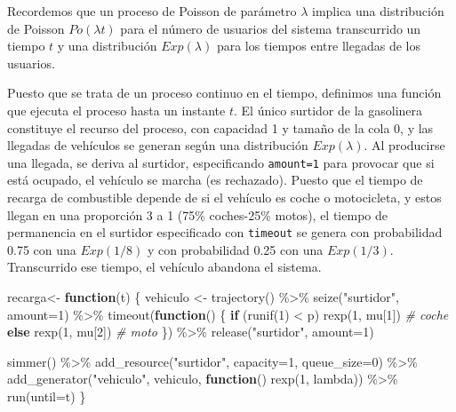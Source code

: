 \documentclass[
]{book}
\newenvironment{Shaded}{\begin{snugshade}}{\end{snugshade}}
\newcommand{\AttributeTok}[1]{\textcolor[rgb]{0.77,0.63,0.00}{#1}}
\newcommand{\CommentTok}[1]{\textcolor[rgb]{0.56,0.35,0.01}{\textit{#1}}}
\newcommand{\ControlFlowTok}[1]{\textcolor[rgb]{0.13,0.29,0.53}{\textbf{#1}}}
\newcommand{\DecValTok}[1]{\textcolor[rgb]{0.00,0.00,0.81}{#1}}
\newcommand{\FunctionTok}[1]{\textcolor[rgb]{0.00,0.00,0.00}{#1}}
\newcommand{\NormalTok}[1]{#1}
\newcommand{\OtherTok}[1]{\textcolor[rgb]{0.56,0.35,0.01}{#1}}
\newcommand{\SpecialCharTok}[1]{\textcolor[rgb]{0.00,0.00,0.00}{#1}}
\newcommand{\StringTok}[1]{\textcolor[rgb]{0.31,0.60,0.02}{#1}}
\theoremstyle{definition}
\theoremstyle{definition}
\theoremstyle{definition}
\theoremstyle{definition}
\theoremstyle{remark}
\begin{document}
Recordemos que un proceso de Poisson de parámetro \(\lambda\) implica una distribución de Poisson \(Po(\lambda t)\) para el número de usuarios del sistema transcurrido un tiempo \(t\) y una distribución \(Exp(\lambda)\) para los tiempos entre llegadas de los usuarios.

Puesto que se trata de un proceso continuo en el tiempo, definimos una función que ejecuta el proceso hasta un instante \(t\). El único surtidor de la gasolinera constituye el recurso del proceso, con capacidad 1 y tamaño de la cola 0, y las llegadas de vehículos se generan según una distribución \(Exp(\lambda)\). Al producirse una llegada, se deriva al surtidor, especificando \texttt{amount=1} para provocar que si está ocupado, el vehículo se marcha (es rechazado). Puesto que el tiempo de recarga de combustible depende de si el vehículo es coche o motocicleta, y estos llegan en una proporción 3 a 1 (75\% coches-25\% motos), el tiempo de permanencia en el surtidor especificado con \texttt{timeout} se genera con probabilidad 0.75 con una \(Exp(1/8)\) y con probabilidad 0.25 con una \(Exp(1/3)\). Transcurrido ese tiempo, el vehículo abandona el sistema.

\begin{Shaded}
\begin{Highlighting}[]
\NormalTok{ recarga}\OtherTok{\textless{}{-}} \ControlFlowTok{function}\NormalTok{(t) \{}
\NormalTok{  vehiculo }\OtherTok{\textless{}{-}} \FunctionTok{trajectory}\NormalTok{() }\SpecialCharTok{\%\textgreater{}\%}
    \FunctionTok{seize}\NormalTok{(}\StringTok{"surtidor"}\NormalTok{, }\AttributeTok{amount=}\DecValTok{1}\NormalTok{) }\SpecialCharTok{\%\textgreater{}\%}
    \FunctionTok{timeout}\NormalTok{(}\ControlFlowTok{function}\NormalTok{() \{}
      \ControlFlowTok{if}\NormalTok{ (}\FunctionTok{runif}\NormalTok{(}\DecValTok{1}\NormalTok{) }\SpecialCharTok{\textless{}}\NormalTok{ p) }\FunctionTok{rexp}\NormalTok{(}\DecValTok{1}\NormalTok{, mu[}\DecValTok{1}\NormalTok{])  }\CommentTok{\# coche}
      \ControlFlowTok{else} \FunctionTok{rexp}\NormalTok{(}\DecValTok{1}\NormalTok{, mu[}\DecValTok{2}\NormalTok{])               }\CommentTok{\# moto}
\NormalTok{    \}) }\SpecialCharTok{\%\textgreater{}\%}
    \FunctionTok{release}\NormalTok{(}\StringTok{"surtidor"}\NormalTok{, }\AttributeTok{amount=}\DecValTok{1}\NormalTok{)}

\FunctionTok{simmer}\NormalTok{() }\SpecialCharTok{\%\textgreater{}\%}
    \FunctionTok{add\_resource}\NormalTok{(}\StringTok{"surtidor"}\NormalTok{, }\AttributeTok{capacity=}\DecValTok{1}\NormalTok{, }\AttributeTok{queue\_size=}\DecValTok{0}\NormalTok{) }\SpecialCharTok{\%\textgreater{}\%}
    \FunctionTok{add\_generator}\NormalTok{(}\StringTok{"vehiculo"}\NormalTok{, vehiculo, }\ControlFlowTok{function}\NormalTok{() }\FunctionTok{rexp}\NormalTok{(}\DecValTok{1}\NormalTok{, lambda)) }\SpecialCharTok{\%\textgreater{}\%}
    \FunctionTok{run}\NormalTok{(}\AttributeTok{until=}\NormalTok{t)}
\NormalTok{ \}}
\end{Highlighting}
\end{Shaded}
\end{document}
